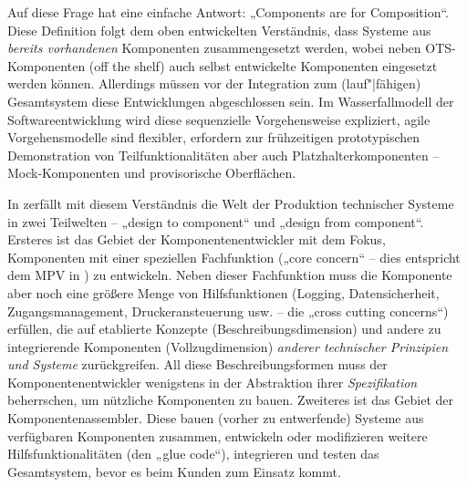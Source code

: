 \documentclass[11pt,a4paper]{article}
\begin{document}
Auf diese Frage hat \cite{Szyperski2002} eine einfache Antwort: „Components
are for Composition“.  Diese Definition folgt dem oben entwickelten
Verständnis, dass Systeme aus \emph{bereits vorhandenen} Komponenten
zusammengesetzt werden, wobei neben OTS-Komponenten (off the shelf) auch
selbst entwickelte Komponenten eingesetzt werden können. Allerdings müssen vor
der Integration zum (lauf"|fähigen) Gesamtsystem diese Entwicklungen
abgeschlossen sein. Im Wasserfallmodell der Softwareentwicklung wird diese
sequenzielle Vorgehensweise expliziert, agile Vorgehensmodelle sind flexibler,
erfordern zur frühzeitigen prototypischen Demonstration von
Teilfunktionalitäten aber auch Platzhalterkomponenten -- Mock-Komponenten und
provisorische Oberflächen.

In \cite{Szyperski2002} zerfällt mit diesem Verständnis die Welt der
Produktion technischer Systeme in zwei Teilwelten -- „design to component“ und
„design from component“. Ersteres ist das Gebiet der Komponentenentwickler mit
dem Fokus, Komponenten mit einer speziellen Fachfunktion („core concern“ --
dies entspricht dem MPV in \cite{TESE2018}) zu entwickeln. Neben dieser
Fachfunktion muss die Komponente aber noch eine größere Menge von
Hilfsfunktionen (Logging, Datensicherheit, Zugangsmanagement,
Druckeransteuerung usw. -- die „cross cutting concerns“) erfüllen, die auf
etablierte Konzepte (Beschreibungsdimension) und andere zu integrierende
Komponenten (Vollzugdimension) \emph{anderer technischer Prinzipien und
  Systeme} zurückgreifen.  All diese Beschreibungsformen muss der
Komponentenentwickler wenigstens in der Abstraktion ihrer \emph{Spezifikation}
beherrschen, um nützliche Komponenten zu bauen.  Zweiteres ist das Gebiet der
Komponentenassembler. Diese bauen (vorher zu entwerfende) Systeme aus
verfügbaren Komponenten zusammen, entwickeln oder modifizieren weitere
Hilfsfunktionalitäten (den „glue code“), integrieren und testen das
Gesamtsystem, bevor es beim Kunden zum Einsatz kommt.
\end{document}
